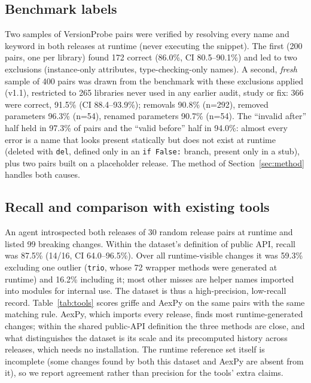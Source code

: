 \documentclass[10pt,twocolumn,letterpaper]{article}
\begin{document}
\subsection{Benchmark labels}\label{sec:benchlabels}
Two samples of VersionProbe pairs were verified by resolving every name and keyword in both releases at runtime
(never executing the snippet). The first (200 pairs, one per library) found 172 correct
(86.0\%, CI 80.5--90.1\%) and led to two exclusions (instance-only attributes, type-checking-only
names). A second, \emph{fresh} sample of 400 pairs was drawn from the benchmark with these exclusions applied (v1.1), restricted to
265 libraries never used in any earlier audit, study or fix: 366 were correct, 91.5\% (CI 88.4--93.9\%);
removals 90.8\% (n=292), removed parameters 96.3\%
(n=54), renamed parameters 90.7\% (n=54). The ``invalid after''
half held in 97.3\% of pairs and the ``valid before'' half in 94.0\%: almost every error is a
name that looks present statically but does not exist at runtime (deleted with \texttt{del}, defined only in an
\texttt{if False:} branch, present only in a stub), plus two pairs built on a placeholder release. The method of Section~\ref{sec:method} handles both causes.

\subsection{Recall and comparison with existing tools}\label{sec:recall}
An agent introspected both releases of 30 random release pairs at runtime and listed 99 breaking changes. Within the
dataset's definition of public API, recall was 87.5\% (14/16, CI 64.0--96.5\%). Over
all runtime-visible changes it was 59.3\% excluding one outlier (\texttt{trio}, whose 72 wrapper methods were
generated at runtime) and 16.2\% including it; most other misses are helper names imported into modules for
internal use. The dataset is thus a high-precision, low-recall record. Table~\ref{tab:tools} scores griffe and AexPy on
the same pairs with the same matching rule. AexPy, which imports every release, finds most runtime-generated changes;
within the shared public-API definition the three methods are close, and what distinguishes the dataset is its scale
and its precomputed history across releases, which needs no installation. The runtime reference set itself is incomplete (some changes found by both this
dataset and AexPy are absent from it), so we report agreement rather than precision for the tools' extra claims.
\end{document}
